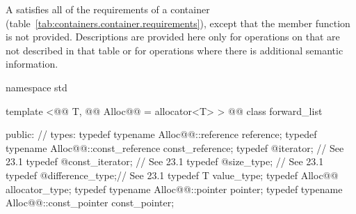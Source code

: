 \documentclass[american,twoside]{book}
\begin{document}
\pnum
A  satisfies all of the requirements of a container (table~\ref{tab:containers.container.requirements}), except that the  member function is not provided. Descriptions are provided here only for operations on  that are not described in that table or for operations where there is additional semantic information.

\begin{codeblock}
namespace std { 
  template <@@ T, @@ Alloc@@ = allocator<T> > 
  @@
  class forward_list { 
  public: 
    // types: 
    typedef typename Alloc@@::reference reference; 
    typedef typename Alloc@@::const_reference const_reference; 
    typedef @\impdef@ iterator;       // See 23.1 
    typedef @\impdef@ const_iterator; // See 23.1 
    typedef @\impdef@ size_type;      // See 23.1 
    typedef @\impdef@ difference_type;// See 23.1 
    typedef T value_type; 
    typedef Alloc@@ allocator_type; 
    typedef typename Alloc@@::pointer pointer; 
    typedef typename Alloc@@::const_pointer const_pointer; 

}}
\end{codeblock}
\end{document}
